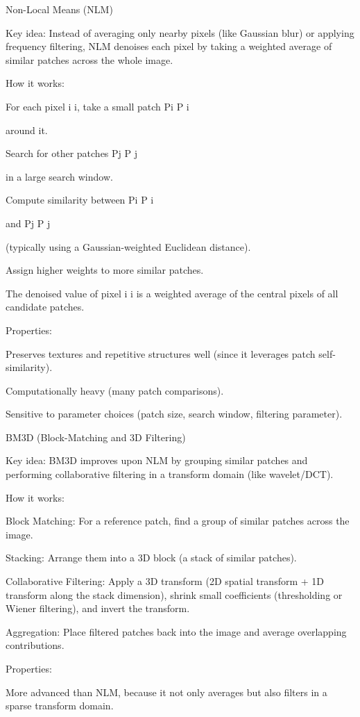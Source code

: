 Non-Local Means (NLM)

Key idea:
Instead of averaging only nearby pixels (like Gaussian blur) or applying frequency filtering, NLM denoises each pixel by taking a weighted average of similar patches across the whole image.

How it works:

For each pixel 
i
i, take a small patch 
Pi
P
i
	​

 around it.

Search for other patches 
Pj
P
j
	​

 in a large search window.

Compute similarity between 
Pi
P
i
	​

 and 
Pj
P
j
	​

 (typically using a Gaussian-weighted Euclidean distance).

Assign higher weights to more similar patches.

The denoised value of pixel 
i
i is a weighted average of the central pixels of all candidate patches.

Properties:

Preserves textures and repetitive structures well (since it leverages patch self-similarity).

Computationally heavy (many patch comparisons).

Sensitive to parameter choices (patch size, search window, filtering parameter).

BM3D (Block-Matching and 3D Filtering)

Key idea:
BM3D improves upon NLM by grouping similar patches and performing collaborative filtering in a transform domain (like wavelet/DCT).

How it works:

Block Matching: For a reference patch, find a group of similar patches across the image.

Stacking: Arrange them into a 3D block (a stack of similar patches).

Collaborative Filtering: Apply a 3D transform (2D spatial transform + 1D transform along the stack dimension), shrink small coefficients (thresholding or Wiener filtering), and invert the transform.

Aggregation: Place filtered patches back into the image and average overlapping contributions.

Properties:

More advanced than NLM, because it not only averages but also filters in a sparse transform domain.

